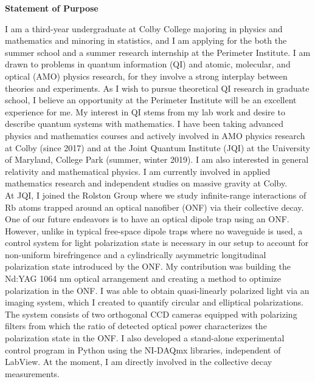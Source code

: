 \documentclass[10pt]{article}
\begin{document}
	
\begin{center}
	\textbf{Statement of Purpose}
\end{center}
	

\noindent I am a third-year undergraduate at Colby College majoring in physics and mathematics and minoring in statistics, and I am applying for the both the summer school and a summer research internship at the Perimeter Institute. I am drawn to problems in quantum information (QI) and atomic, molecular, and optical (AMO) physics research, for they involve a strong interplay between theories and experiments. As I wish to pursue theoretical QI research in graduate school, I believe an opportunity at the Perimeter Institute will be an excellent experience for me. My interest in QI stems from my lab work and desire to describe quantum systems with mathematics. I have been taking advanced physics and mathematics courses and actively involved in AMO physics research at Colby (since 2017) and at the Joint Quantum Institute (JQI) at the University of Maryland, College Park (summer, winter 2019). I am also interested in general relativity and mathematical physics. I am currently involved in applied mathematics research and independent studies on massive gravity at Colby.   \\


At JQI, I joined the Rolston Group where we study infinite-range interactions of Rb atoms trapped around an optical nanofiber (ONF) via their collective decay. One of our future endeavors is to have an optical dipole trap using an ONF. However, unlike in typical free-space dipole traps where no waveguide is used, a control system for light polarization state is necessary in our setup to account for non-uniform birefringence and a cylindrically asymmetric longitudinal polarization state introduced by the ONF. My contribution was building the Nd:YAG 1064 nm optical arrangement and creating a method to optimize polarization in the ONF. I was able to obtain quasi-linearly polarized light via an imaging system, which I created to quantify circular and elliptical polarizations. The system consists of two orthogonal CCD cameras equipped with polarizing filters from which the ratio of detected optical power characterizes the polarization state in the ONF. I also developed a stand-alone experimental control program in Python using the NI-DAQmx libraries, independent of LabView. At the moment, I am directly involved in the collective decay measurements. \\ 
\end{document}
